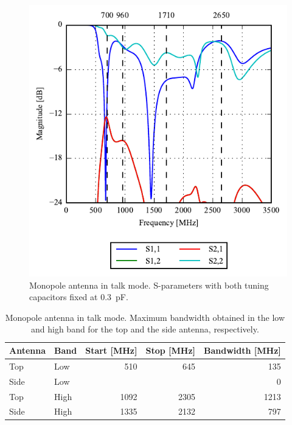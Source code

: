 \begin{figure}[htbp]
    \centering
    \includegraphics{img/tech_sol/monopole/talk_mode/sparams_talk.pdf}
    \caption{Monopole antenna in talk mode. S-parameters with both tuning capacitors fixed at \SI{0.3}{pF}.}
    \label{fig:mono_talk_sparam_data}
\end{figure}

\begin{table}[htbp]
    \centering
    \begin{tabular}{|l|l|r|r|r|}
        \hline
        Antenna & Band & Start [MHz] & Stop [MHz] & Bandwidth [MHz] \\
        \hline
        Top     & Low  & 510 & 645  & 135 \\
        Side    & Low  & & & 0    \\
        \hline
        Top     & High & 1092 & 2305  & 1213 \\
        Side    & High & 1335  & 2132 & 797 \\
        \hline
    \end{tabular}
    \caption{Monopole antenna in talk mode. Maximum bandwidth obtained in the low and high band for the top and the side antenna, respectively.}
    \label{tab:bw_sol1talk}
\end{table}

